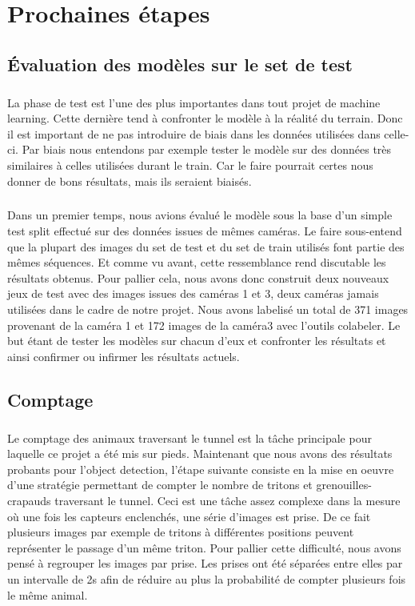 \chapter{Prochaines étapes}\label{chap:next_steps}
\section{Évaluation des modèles sur le set de test}
\paragraph{}La phase de test est l’une des plus importantes dans tout projet de machine learning.  Cette dernière tend à confronter le modèle à la réalité du terrain. Donc il est important de ne pas introduire de biais dans les données utilisées dans celle-ci. Par biais nous entendons par exemple tester le modèle sur des données très similaires à celles utilisées durant le train. Car le faire pourrait certes nous donner de bons résultats, mais ils seraient biaisés.
\paragraph{} Dans un premier temps, nous avions évalué le modèle sous la base d’un simple test split effectué sur des données issues de mêmes caméras. Le faire sous-entend que la plupart des images du set de test et du set de train utilisés font partie des mêmes séquences. Et comme vu avant,  cette ressemblance rend discutable les résultats obtenus.  Pour pallier cela, nous avons donc construit deux nouveaux jeux de test avec des images issues des caméras 1 et 3, deux caméras jamais utilisées dans le cadre de notre projet. Nous avons labelisé un total de 371 images provenant de la caméra 1  et 172 images de la caméra3 avec l’outils colabeler. Le but étant  de tester les modèles sur chacun d’eux et confronter les résultats et ainsi confirmer ou infirmer les résultats actuels.
\section{Comptage}\label{anal:comptage}
\paragraph{} Le comptage des animaux traversant le tunnel est la tâche principale pour laquelle ce projet a été mis sur pieds. Maintenant que nous avons des résultats probants pour l'object detection, l'étape suivante consiste en la mise en oeuvre d'une stratégie permettant de compter le nombre de tritons et grenouilles-crapauds traversant le tunnel. Ceci est une tâche assez complexe dans la mesure où une fois les capteurs enclenchés, une série d'images est prise. De ce fait plusieurs images par exemple de tritons à différentes positions peuvent représenter le passage d'un même triton. Pour pallier cette difficulté, nous avons pensé à regrouper les images par prise. Les prises ont été séparées entre elles par un intervalle de 2s afin de réduire au plus la probabilité de compter plusieurs fois le même animal. 

